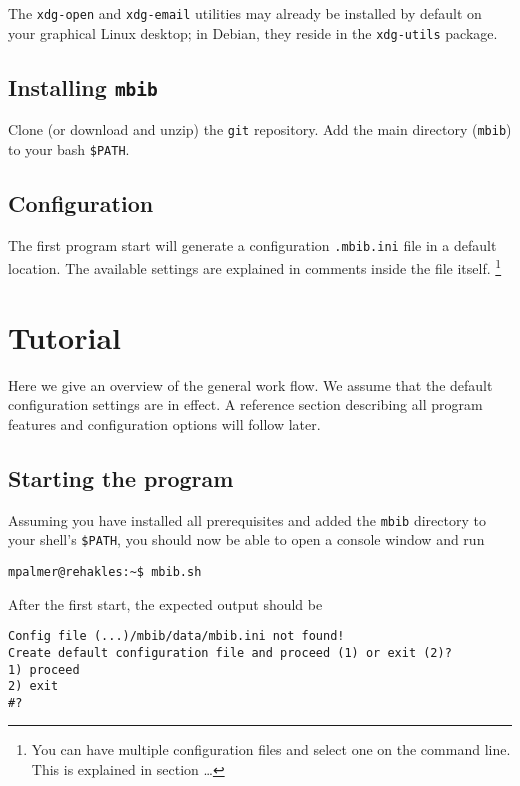 \documentclass[10pt]{article}
\newcommand*{\mbib}{\texttt{mbib}\xspace}
\newcommand*{\ini}{\texttt{.mbib.ini}\xspace}
\begin{document}
The \texttt{xdg-open} and \texttt{xdg-email} utilities may already be installed by default on your graphical Linux desktop; in Debian, they reside in the \texttt{xdg-utils} package.

\subsection{Installing \mbib}

Clone (or download and unzip) the \texttt{git} repository. Add the main directory (\mbib) to your bash \texttt{\$PATH}. 

\subsection{Configuration}

The first program start will generate a configuration \ini file in a default location. The available settings are explained in comments inside the file itself.%
%
\footnote{You can have multiple configuration files and select one on the command line. This is explained in section \dots}

\section{Tutorial}
\label{sec:tutorial}

Here we give an overview of the general work flow. We assume that the default configuration settings are in effect. A reference section describing all program features and configuration options will follow later. 

\subsection{Starting the program}

Assuming you have installed all prerequisites and added the \mbib directory to your shell's \texttt{\$PATH}, you should now be able to open a console window and run 

\begin{verbatim}
mpalmer@rehakles:~$ mbib.sh
\end{verbatim}

\noindent After the first start, the expected output should be 

\begin{verbatim}
Config file (...)/mbib/data/mbib.ini not found!
Create default configuration file and proceed (1) or exit (2)?
1) proceed
2) exit
#? 
\end{verbatim}
\end{document}
